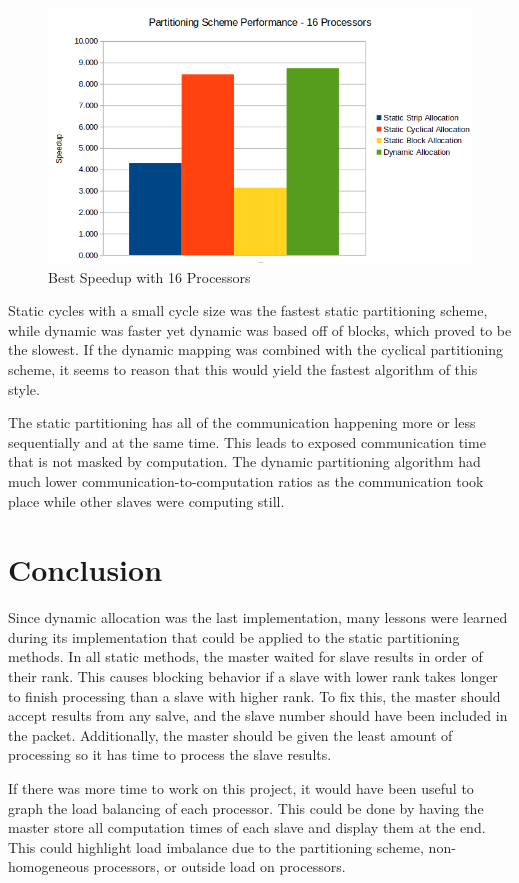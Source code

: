 \documentclass[11pt]{article}
\begin{document}
		\begin{figure}[H]
			\centering
			\includegraphics[width=0.7\linewidth]{Pictures/Comparison}
			\caption{Best Speedup with 16 Processors}
			\label{fig:comparison}
		\end{figure}
	
		Static cycles with a small cycle size was the fastest static partitioning scheme, while dynamic was faster yet dynamic was based off of blocks, which proved to be the slowest. If the dynamic mapping was combined with the cyclical partitioning scheme, it seems to reason that this would yield the fastest algorithm of this style.
		
		The static partitioning has all of the communication happening more or less sequentially and at the same time. This leads to exposed communication time that is not masked by computation. The dynamic partitioning algorithm had much lower communication-to-computation ratios as the communication took place while other slaves were computing still.

\section{Conclusion}

	Since dynamic allocation was the last implementation, many lessons were learned during its implementation that could be applied to the static partitioning methods. In all static methods, the master waited for slave results in order of their rank. This causes blocking behavior if a slave with lower rank takes longer to finish processing than a slave with higher rank. To fix this, the master should accept results from any salve, and the slave number should have been included in the packet. Additionally, the master should be given the least amount of processing so it has time to process the slave results. 
	
	If there was more time to work on this project, it would have been useful to graph the load balancing of each processor. This could be done by having the master store all computation times of each slave and display them at the end. This could highlight load imbalance due to the partitioning scheme, non-homogeneous processors, or outside load on processors. 
\end{document}
